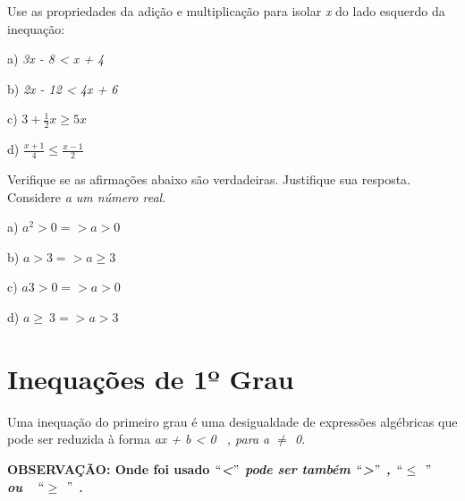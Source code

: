 \begin{exercicios}
	\exitem{} Use as propriedades da adição e multiplicação para isolar \textit{x} do lado esquerdo da inequação: 

    a) \textit{3x - 8 < x + 4}

    b) \textit{2x - 12 < 4x + 6}
    
    c) \( 3+\frac{1}{2}x \geq 5x \)
    
    d) \( \frac{x+1}{4} \leq \frac{x-1}{2} \)

\item Verifique se as afirmações abaixo são verdadeiras. Justifique sua resposta. Considere \textit{a um número real.}

a) $a^{2} > 0 => a > 0$

b) $a > 3  => a \geq 3$

c) $a3 > 0 => a > 0$

d) $a \geq ~3 => a > 3$

\end{exercicios}

\section{Inequações de 1º Grau}

\begin{caixa}

\begin {tdefinicao}
Uma inequação do primeiro grau é uma desigualdade de expressões algébricas que pode ser reduzida à forma
\textit{ax + b < 0~ , para a $ \neq $  0. }

\textbf{OBSERVAÇÃO: Onde foi usado\textit{ $``$<$"$  pode ser também $``$>$"$ , $``$$ \leq $ $"$ ~ ou~~$``$$ \geq $ $"$  .  }}
\end{tdefinicao}
\end{caixa}

